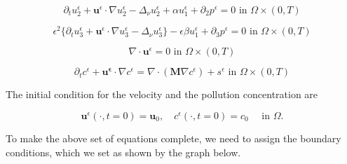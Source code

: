 \documentclass[11pt]{article}
\begin{document}
    \begin{equation} \label{ANSC2}
    \partial_t u_2^\epsilon + \mathbf{u}^\epsilon \cdot \nabla u_2^\epsilon -\Delta_\nu u_2^\epsilon + \alpha u_1^\epsilon + \partial_2 p^\epsilon = 0 \text{ in } \Omega \times (0,T)
    \end{equation}
    
    \begin{equation} \label{ANSC3}
    \epsilon^2 \{  \partial_t u_3^\epsilon + \mathbf{u}^\epsilon \cdot \nabla u_3^\epsilon -\Delta_\nu u_3^{\epsilon} \} - \epsilon \beta u_1^\epsilon + \partial_3 p^\epsilon = 0 \text{ in } \Omega \times (0,T)
    \end{equation}
    
    \begin{equation} \label{ANSC4}
    \nabla \cdot \mathbf{u}^\epsilon= 0 \text{ in } \Omega \times (0,T)
    \end{equation}
    
    \begin{equation} \label{ANSC5}
    \partial_t c^\epsilon + \mathbf{u^\epsilon} \cdot \nabla c^\epsilon = \nabla \cdot (\mathbf{M} \nabla c^\epsilon) + s^\epsilon \text{ in } \Omega \times (0,T)
    \end{equation}

The initial condition for the velocity and the pollution concentration are
    
    \begin{equation} \label{ANSC7}
    \mathbf{u}^\epsilon (\cdot, t = 0) = \mathbf{u}_0, \quad c^\epsilon (\cdot, t=0) = c_0  \quad \text{ in } \Omega.
    \end{equation}
    
To make the above set of equations complete, we need to assign the boundary conditions, which we set as shown by the graph below.

\begin{figure}[!h]
  \centering
\end{figure}
  
\end{document}

